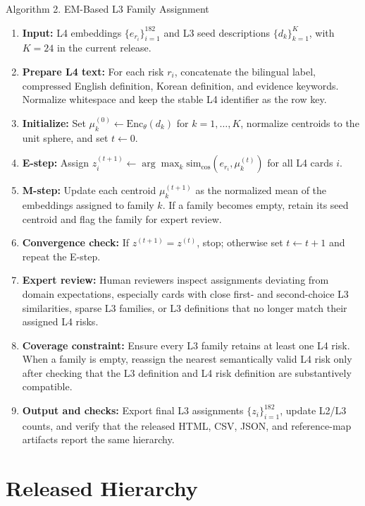 \documentclass[11pt]{article}
\newcommand{\Enc}{\mathrm{Enc}_{\theta}}
\newcommand{\simcos}{\mathrm{sim}_{\cos}}
\begin{document}
\begin{algobox}{Algorithm 2. EM-Based L3 Family Assignment}
\begin{enumerate}[leftmargin=1.6em,itemsep=0.35em]
  \item \textbf{Input:} L4 embeddings \(\{e_{r_i}\}_{i=1}^{182}\) and L3 seed descriptions \(\{d_k\}_{k=1}^{K}\), with \(K=24\) in the current release.
  \item \textbf{Prepare L4 text:} For each risk \(r_i\), concatenate the bilingual label, compressed English definition, Korean definition, and evidence keywords. Normalize whitespace and keep the stable L4 identifier as the row key.
  \item \textbf{Initialize:} Set \(\mu_k^{(0)}\leftarrow\Enc(d_k)\) for \(k=1,\ldots,K\), normalize centroids to the unit sphere, and set \(t\leftarrow0\).
  \item \textbf{E-step:} Assign \(z_i^{(t+1)}\leftarrow\arg\max_k \simcos(e_{r_i},\mu_k^{(t)})\) for all L4 cards \(i\).
  \item \textbf{M-step:} Update each centroid \(\mu_k^{(t+1)}\) as the normalized mean of the embeddings assigned to family \(k\). If a family becomes empty, retain its seed centroid and flag the family for expert review.
  \item \textbf{Convergence check:} If \(z^{(t+1)}=z^{(t)}\), stop; otherwise set \(t\leftarrow t+1\) and repeat the E-step.
  \item \textbf{Expert review:} Human reviewers inspect assignments deviating from domain expectations, especially cards with close first- and second-choice L3 similarities, sparse L3 families, or L3 definitions that no longer match their assigned L4 risks.
  \item \textbf{Coverage constraint:} Ensure every L3 family retains at least one L4 risk. When a family is empty, reassign the nearest semantically valid L4 risk only after checking that the L3 definition and L4 risk definition are substantively compatible.
  \item \textbf{Output and checks:} Export final L3 assignments \(\{z_i\}_{i=1}^{182}\), update L2/L3 counts, and verify that the released HTML, CSV, JSON, and reference-map artifacts report the same hierarchy.
\end{enumerate}
\end{algobox}

\section{Released Hierarchy}
\end{document}
